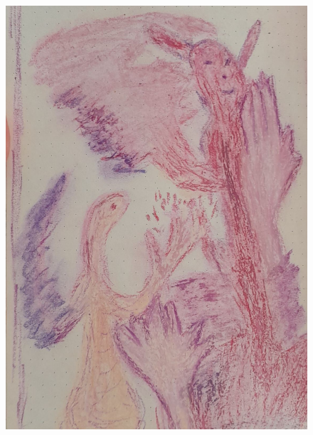 \documentclass[12pt, a4paper, twoside]{book} %
\begin{document}
\begin{figure}[H]
	\centering
	\includegraphics[width=\textwidth]{./images/1f81324ddf333e.jpg}
\end{figure}
\end{document}
